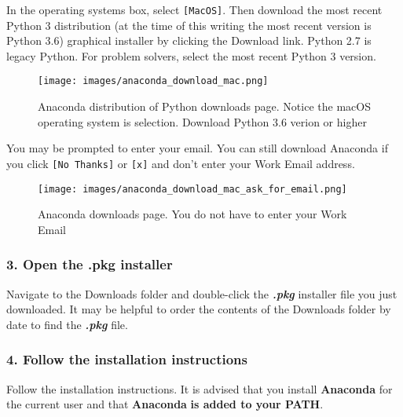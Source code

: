 \documentclass{book}
\makeatletter
\def\maxwidth{\ifdim\Gin@nat@width>\linewidth\linewidth
\else\Gin@nat@width\fi}
\let\Oldincludegraphics\includegraphics
\renewcommand{\includegraphics}[1]{\Oldincludegraphics[width=.8\maxwidth]{#1}}
\newcommand{\passthrough}[1]{#1}
\makeatother
\begin{document}
In the operating systems box, select \passthrough{\lstinline![MacOS]!}.
Then download the most recent Python 3 distribution (at the time of this
writing the most recent version is Python 3.6) graphical installer by
clicking the Download link. Python 2.7 is legacy Python. For problem
solvers, select the most recent Python 3 version.

\begin{figure}
\centering
\texttt{[image: images/anaconda\_download\_mac.png]}
\caption{Anaconda distribution of Python downloads page. Notice the
macOS operating system is selection. Download Python 3.6 verion or
higher}
\end{figure}

You may be prompted to enter your email. You can still download Anaconda
if you click \passthrough{\lstinline![No Thanks]!} or
\passthrough{\lstinline![x]!} and don't enter your Work Email address.

\begin{figure}
\centering
\texttt{[image: images/anaconda\_download\_mac\_ask\_for\_email.png]}
\caption{Anaconda downloads page. You do not have to enter your Work
Email}
\end{figure}
    




    
        \hypertarget{open-the-.pkg-installer}{%
\subsubsection{3. Open the .pkg
installer}\label{open-the-.pkg-installer}}

Navigate to the Downloads folder and double-click the
\textbf{\emph{.pkg}} installer file you just downloaded. It may be
helpful to order the contents of the Downloads folder by date to find
the \textbf{\emph{.pkg}} file.
    




    
        \hypertarget{follow-the-installation-instructions}{%
\subsubsection{4. Follow the installation
instructions}\label{follow-the-installation-instructions}}

Follow the installation instructions. It is advised that you install
\textbf{Anaconda} for the current user and that \textbf{Anaconda}
\textbf{is added to your PATH}.
    
\end{document}
